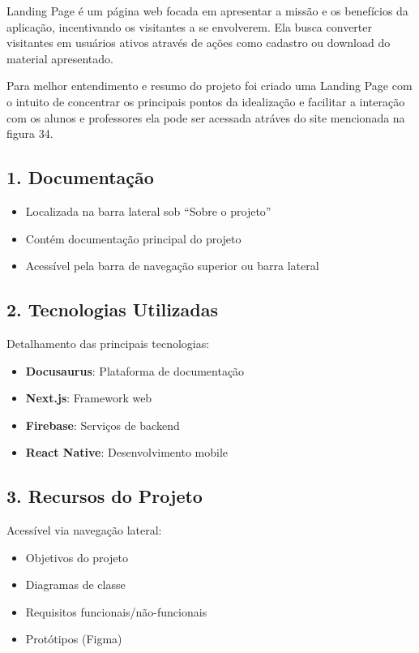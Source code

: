 Landing Page é um página web focada em apresentar a missão e os benefícios da aplicação, incentivando os visitantes a se envolverem. Ela busca converter visitantes em usuários ativos através de ações como cadastro ou download do material apresentado.

Para melhor entendimento e resumo do projeto foi criado uma Landing Page com o intuito de concentrar os principais pontos da idealização e facilitar a interação com os alunos e professores ela pode ser acessada atráves do site mencionada na figura 34. 


\subsection{1. Documentação}
\begin{itemize}
    \item Localizada na barra lateral sob ``Sobre o projeto''
    \item Contém documentação principal do projeto
    \item Acessível pela barra de navegação superior ou barra lateral
\end{itemize}

\subsection{2. Tecnologias Utilizadas}
Detalhamento das principais tecnologias:
\begin{itemize}
    \item \textbf{Docusaurus}: Plataforma de documentação
    \item \textbf{Next.js}: Framework web
    \item \textbf{Firebase}: Serviços de backend
    \item \textbf{React Native}: Desenvolvimento mobile
\end{itemize}

\subsection{3. Recursos do Projeto}
Acessível via navegação lateral:
\begin{itemize}
    \item Objetivos do projeto
    \item Diagramas de classe
    \item Requisitos funcionais/não-funcionais
    \item Protótipos (Figma)
\end{itemize}

